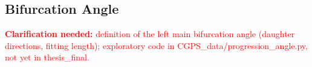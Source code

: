 \providecommand{\clarify}[1]{\textcolor{red}{\textbf{Clarification needed:} #1}}
\subsection{Bifurcation Angle}
\label{sec:method-angle}

\clarify{definition of the left main bifurcation angle (daughter directions, fitting length); exploratory code in CGPS\_data/progression\_angle.py, not yet in thesis\_final.}
